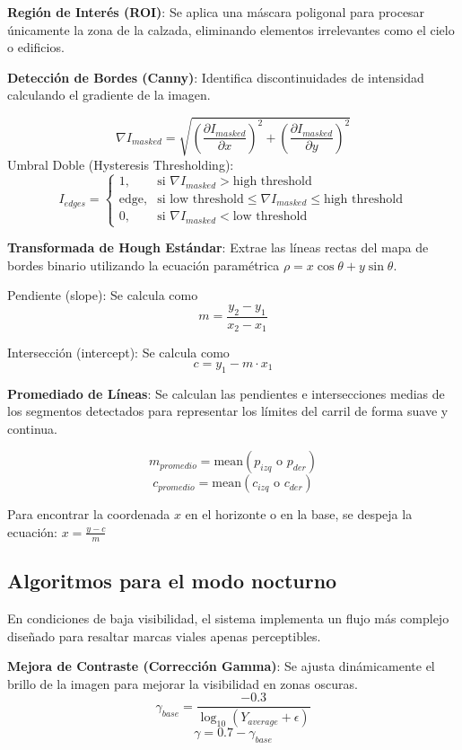 \documentclass{article}
\begin{document}
\textbf{Región de Interés (ROI)}: Se aplica una máscara poligonal para procesar únicamente la zona de la calzada, eliminando elementos irrelevantes como el cielo o edificios.

\textbf{Detección de Bordes (Canny)}: Identifica discontinuidades de intensidad calculando el gradiente de la imagen.

$$\nabla I_{masked} = \sqrt{\left(\frac{\partial I_{masked}}{\partial x}\right)^{2} + \left(\frac{\partial I_{masked}}{\partial y}\right)^{2}} $$
Umbral Doble (Hysteresis Thresholding):
$$I_{edges} = \begin{cases} 1, & \text{si } \nabla I_{masked} > \text{high threshold} \\ \text{edge}, & \text{si } \text{low threshold} \le \nabla I_{masked} \le \text{high threshold} \\ 0, & \text{si } \nabla I_{masked} < \text{low threshold} \end{cases}$$

\textbf{Transformada de Hough Estándar}: Extrae las líneas rectas del mapa de bordes binario utilizando la ecuación paramétrica $\rho = x \cos \theta + y \sin \theta$.


Pendiente (slope): Se calcula como $$m = \frac{y_2 - y_1}{x_2 - x_1}$$
 

Intersección (intercept): Se calcula como $$c = y_1 - m \cdot x_1$$


\textbf{Promediado de Líneas}: Se calculan las pendientes e intersecciones medias de los segmentos detectados para representar los límites del carril de forma suave y continua.

$$m_{promedio} = \text{mean}(p_{izq} \text{ o } p_{der})$$$$c_{promedio} = \text{mean}(c_{izq} \text{ o } c_{der})$$

Para encontrar la coordenada $x$ en el horizonte o en la base, se despeja la ecuación: $x = \frac{y - c}{m}$

\subsection{Algoritmos para el modo nocturno}
En condiciones de baja visibilidad, el sistema implementa un flujo más complejo diseñado para resaltar marcas viales apenas perceptibles.


\textbf{Mejora de Contraste (Corrección Gamma)}: Se ajusta dinámicamente el brillo de la imagen para mejorar la visibilidad en zonas oscuras.
$$\gamma_{base} = \frac{-0.3}{\log_{10}(Y_{average} + \epsilon)}$$
$$\gamma = 0.7 - \gamma_{base}$$
\end{document}

